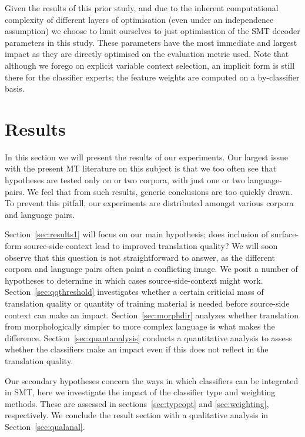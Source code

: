 \documentclass[smallextended]{svjour3}       %
\theoremstyle{break}
\begin{document}
Given the results of this prior study, and due to the inherent computational
complexity of different layers of optimisation (even under an independence
assumption) we choose to limit ourselves to just optimisation of the SMT
decoder parameters in this study. These parameters have the most immediate and
largest impact as they are directly optimised on the evaluation metric used.
Note that although we forego on explicit variable context selection, an
implicit form is still there for the classifier experts; the feature weights
are computed on a by-classifier basis.

\section{Results}

In this section we will present the results of our experiments.
Our largest issue with the present MT literature on this subject is that we too often
see that hypotheses are tested only on or two corpora, with just one or two
language-pairs. We feel that from such results, generic conclusions are too
quickly drawn. To prevent this pitfall, our experiments are distributed amongst
various corpora and language pairs.

Section~\ref{sec:results1} will focus on our main hypothesis; does inclusion
of surface-form source-side-context lead to improved translation quality? We
will soon observe that this question is not straightforward to answer, as
the different corpora and language pairs often paint a conflicting image. We
posit a number of hypotheses to determine in which cases source-side-context
might work. Section~\ref{sec:qqthreshold} investigates whether a certain
criticial mass of translation quality or quantity of training material is needed
before source-side context can make an impact. Section~\ref{sec:morphdir}
analyzes whether translation from morphologically simpler to more complex
language is what makes the difference. Section~\ref{sec:quantanalysis} conducts
a quantitative analysis to assess whether the classifiers make an impact even
if this does not reflect in the translation quality.

Our secondary hypotheses concern the ways in which classifiers can be
integrated in SMT, here we investigate the impact of the classifier type and
weighting methods.  These are assessed in sections~\ref{sec:typeopt} and
\ref{sec:weighting}, respectively. We conclude the result section with a
qualitative analysis in Section~\ref{sec:qualanal}.
\end{document}
